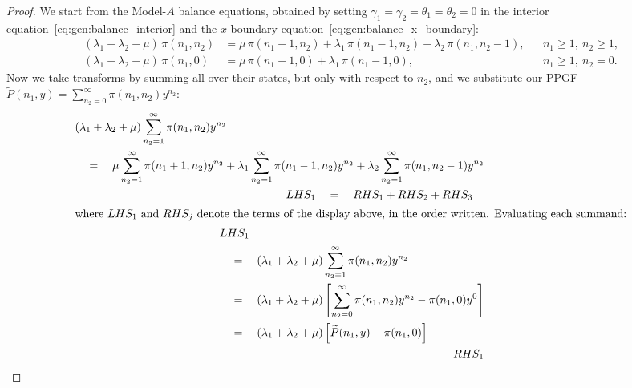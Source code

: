 \begin{proof}
    We start from the Model-$A$ balance equations, obtained by setting $\gamma_1=\gamma_2=\theta_1=\theta_2=0$ in the interior equation~\eqref{eq:gen:balance_interior} and the $x$-boundary equation~\eqref{eq:gen:balance_x_boundary}:
    \begin{align}
        (\lambda_1+\lambda_2+\mu)\,\pi(n_1,n_2)
            &= \mu\,\pi(n_1+1,n_2) + \lambda_1\,\pi(n_1-1,n_2) + \lambda_2\,\pi(n_1,n_2-1),
            && n_1\geq1,\ n_2\geq1, \nonumber\\
        (\lambda_1+\lambda_2+\mu)\,\pi(n_1,0)
            &= \mu\,\pi(n_1+1,0) + \lambda_1\,\pi(n_1-1,0),
            && n_1\geq1,\ n_2=0. \label{eq:A:ppgf_xbound}
    \end{align}
    Now we take transforms by summing all over their states, but only with respect to $n_2$, and we substitute our PPGF $\widetilde{P}(n_1,y)=\sum_{n_2=0}^{\infty} \pi(n_1,n_2)y^{n_2}$:
    \begin{align}
        \begin{split}
            & (\lambda_1+\lambda_2+\mu)\sum_{n_2=1}^{\infty}\pi(n_1,n_2)y^{n_2} \\
            & \quad = \quad \mu\sum_{n_2=1}^{\infty}\pi(n_1+1,n_2)y^{n_2} + \lambda_1\sum_{n_2=1}^{\infty}\pi(n_1-1,n_2)y^{n_2} + \lambda_2\sum_{n_2=1}^{\infty}\pi(n_1,n_2-1)y^{n_2}
        \end{split} \nonumber \\
        \begin{split}
            & LHS_1 \quad = \quad RHS_1 + RHS_2 + RHS_3
        \end{split} \nonumber \\
        \intertext{where $LHS_1$ and $RHS_j$ denote the terms of the display above, in the order written. Evaluating each summand:}
        \begin{split}
            & LHS_1 \\
            & \quad = \quad (\lambda_1+\lambda_2+\mu)\sum_{n_2=1}^{\infty}\pi(n_1,n_2)y^{n_2} \\
            & \quad = \quad (\lambda_1+\lambda_2+\mu) \left[ \sum_{n_2=0}^{\infty}\pi(n_1,n_2)y^{n_2} - \pi(n_1,0)y^0 \right] \\
            & \quad = \quad (\lambda_1+\lambda_2+\mu) \left[ \widetilde{P}(n_1,y) - \pi(n_1,0) \right]
        \end{split} \nonumber \\
        \begin{split}
            & RHS_1 \\

\end{split}
\end{align}
\end{proof}
